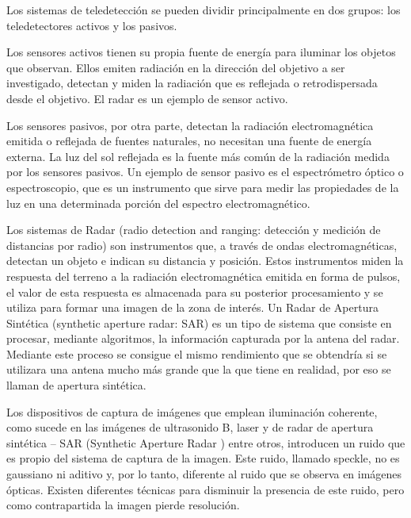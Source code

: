 Los sistemas de teledetección se pueden dividir principalmente en dos grupos: los teledetectores activos y los pasivos. 

Los sensores activos tienen su propia fuente de energía para iluminar los objetos que observan. 
Ellos emiten radiación en la dirección del objetivo a ser investigado, detectan y miden la radiación que es reflejada o retrodispersada desde el objetivo. 
El radar es un ejemplo de sensor activo.

Los sensores pasivos, por otra parte, detectan la radiación electromagnética emitida o reflejada de fuentes naturales, no necesitan una fuente de energía externa. 
La luz del sol reflejada es la fuente más común de la radiación medida por los sensores pasivos. 
Un ejemplo de sensor pasivo es el espectrómetro óptico o espectroscopio, que es un instrumento que sirve para medir las propiedades de la luz en una determinada porción del espectro electromagnético. 



Los sistemas de Radar (radio detection and ranging: detección y medición de distancias por radio) son instrumentos que, a través de ondas electromagnéticas, detectan un objeto e indican su distancia y posición. Estos instrumentos miden la respuesta del terreno a la radiación electromagnética emitida en forma de pulsos, el valor de esta respuesta es almacenada para su posterior procesamiento y se utiliza para formar una imagen de la zona de interés. Un Radar de Apertura Sintética (synthetic aperture radar: SAR) es un tipo de sistema que consiste en procesar, mediante algoritmos, la información capturada por la antena del radar. Mediante este proceso se consigue el mismo rendimiento que se obtendría si se utilizara una antena mucho más grande que la que tiene en realidad, por eso se llaman de apertura sintética. 

Los dispositivos de captura de imágenes que emplean iluminación coherente, como sucede en las imágenes de ultrasonido B, laser y de radar de apertura sintética – SAR (Synthetic Aperture Radar ) entre otros, introducen un ruido que es propio del sistema de captura de la imagen. Este ruido, llamado speckle, no es gaussiano ni aditivo y, por lo tanto, diferente al ruido que se observa en imágenes ópticas. Existen diferentes técnicas para disminuir la presencia de este ruido, pero como contrapartida la imagen pierde resolución.

